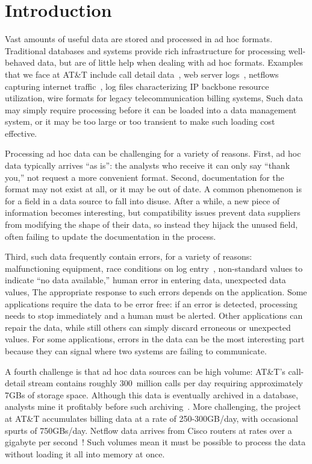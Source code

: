 \chapter{Introduction}
\label{chap:introduction}
Vast amounts of useful data are stored and processed in ad hoc formats.
Traditional databases and \xml{} systems provide rich infrastructure
for processing well-behaved data, but are of little help when dealing with ad hoc formats.
Examples that we face at AT\&T include call detail data~\cite{hancock-toplas}, 
web server logs~\cite{wpp}, 
netflows capturing internet traffic~\cite{netflow}, 
log files characterizing IP backbone resource utilization,
wire formats for legacy telecommunication billing systems, 
\etc{}
Such data may simply require processing before it can be loaded into a
data management system, or it may be too large or too transient to
make such loading cost effective.

Processing ad hoc data can be challenging for a variety of
reasons. First, ad hoc data typically arrives ``as is'': the analysts
who receive it can only say ``thank you,'' not request a more convenient format. 
Second, documentation for the format may not exist at all, or it may be
out of date.  A common phenomenon is for a field in a
data source to fall into disuse.  After a while, a new piece of
information becomes interesting, but compatibility issues prevent 
data suppliers from modifying the
shape of their data, so instead they hijack the unused field, often
failing to update the documentation in the process.

Third, such data frequently contain errors, for a variety of
reasons: malfunctioning equipment, race conditions on log
entry~\cite{wpp}, non-standard values to indicate ``no data
available,'' human error in entering data, unexpected data
values, \etc{} The appropriate response to such errors depends on the application. Some applications require the data to be error free: 
if an error is detected, processing needs to stop immediately and a human
must be alerted.  Other applications can repair the data, while still
others can simply discard erroneous or unexpected values.  
For some applications,
errors in the data can be the most interesting part  because
they can signal where two systems are failing to communicate.

A fourth challenge is that ad hoc data sources can be high volume:
AT\&T's call-detail stream contains roughly 300~million calls per day
requiring approximately 7GBs of storage space. Although this data is
eventually archived in a database, analysts mine it profitably before
such archiving~\cite{kdd98,kdd99}. More challenging, the \ningaui{} project at AT\&T
accumulates billing data at a rate
of 250-300GB/day, with occasional spurts of 750GBs/day. Netflow data
arrives from Cisco routers at rates over a gigabyte per
second~\cite{gigascope}! Such volumes mean it must be possible to
process the data without loading it all into memory at once.

